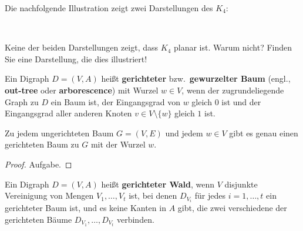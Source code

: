 \begin{bsp}
Die nachfolgende Illustration zeigt zwei Darstellungen des $K_4$:
\begin{center}
\hfill
{}
\hfill
{}
\hfill\,
\end{center}
Keine der beiden Darstellungen zeigt, dass $K_4$ planar ist.
Warum nicht?
Finden Sie eine Darstellung, die dies illustriert!
\end{bsp}

\begin{defn}
	Ein Digraph $D=(V,A)$  heißt \textbf{gerichteter} bzw.~\textbf{gewurzelter Baum} (engl., \textbf{out-tree} oder \textbf{arborescence}) mit Wurzel $w \in V$, wenn der zugrundeliegende Graph zu $D$ ein Baum ist, der Eingangsgrad von $w$ gleich $0$ ist und der Eingangsgrad aller anderen Knoten $v \in V \setminus \{w\}$ gleich $1$ ist. 
\end{defn} 

\begin{prop}
	Zu jedem ungerichteten Baum $G=(V,E)$ und jedem $w \in V$ gibt es genau einen gerichteten Baum zu $G$ mit der Wurzel $w$. 
\end{prop} 
\begin{proof}
	Aufgabe. 
\end{proof} 

\begin{defn}
	Ein Digraph $D=(V,A)$ heißt \textbf{gerichteter Wald}, wenn $V$ disjunkte Vereinigung von Mengen $V_1,\ldots,V_t$ ist, bei denen $D_{V_i}$ für jedes $i=1,\ldots,t$ ein gerichteter Baum ist, und es keine Kanten in $A$ gibt, die zwei verschiedene der gerichteten Bäume $D_{V_1},\ldots,D_{V_t}$ verbinden.
\end{defn} 

